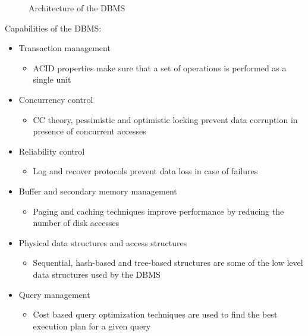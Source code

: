 \documentclass[english]{article}
\begin{document}
\begin{figure}[htbp]
  \centering
  \bigskip
  \bigskip
  \caption{Architecture of the DBMS}
  \label{fig:architecture}
\end{figure}

Capabilities of the DBMS:

\begin{itemize}
  \item Transaction management
        \begin{itemize}[label=\(\rightarrow\)]
          \item ACID properties make sure that a set of operations is performed as a single unit
        \end{itemize}
  \item Concurrency control
        \begin{itemize}[label=\(\rightarrow\)]
          \item CC theory, pessimistic and optimistic locking prevent data corruption in presence of concurrent accesses
        \end{itemize}
  \item Reliability control
        \begin{itemize}[label=\(\rightarrow\)]
          \item Log and recover protocols prevent data loss in case of failures
        \end{itemize}
  \item Buffer and secondary memory management
        \begin{itemize}[label=\(\rightarrow\)]
          \item Paging and caching techniques improve performance by reducing the number of disk accesses
        \end{itemize}
  \item Physical data structures and access structures
        \begin{itemize}[label=\(\rightarrow\)]
          \item Sequential, hash-based and tree-based structures are some of the low level data structures used by the DBMS
        \end{itemize}
  \item Query management
        \begin{itemize}[label=\(\rightarrow\)]
          \item Cost based query optimization techniques are used to find the best execution plan for a given query
        \end{itemize}
\end{itemize}
\end{document}
